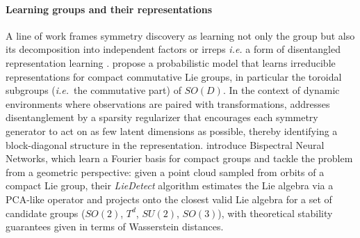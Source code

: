 \documentclass[mathematics,review,submit,moreauthors]{Definitions/mdpi}
\begin{document}
\paragraph{Learning groups and their representations}
A line of work frames symmetry discovery as learning not only the group but also its decomposition into independent factors or irreps \textit{i.e.} a form of disentangled representation learning \citep{higgins2018}.
\citet{cohen2014} propose a probabilistic model that learns irreducible representations for compact commutative Lie groups, in particular the toroidal subgroups (\textit{i.e.}\ the commutative part) of $SO(D)$.
In the context of dynamic environments where observations are paired with transformations, \citet{quessard2020anips} addresses disentanglement by a sparsity regularizer that encourages each symmetry generator to act on as few latent dimensions as possible, thereby identifying a block-diagonal structure in the representation.
\citet{sanborn2022} introduce Bispectral Neural Networks, which learn a Fourier basis for compact groups and \citet{ennes2025fcm} tackle the problem from a geometric perspective: given a point cloud sampled from orbits of a compact Lie group, their \textit{LieDetect} algorithm estimates the Lie algebra via a PCA-like operator and projects onto the closest valid Lie algebra for a set of candidate groups ($SO(2)$, $T^d$, $SU(2)$, $SO(3)$), with theoretical stability guarantees given in terms of Wasserstein distances.

\end{document}
